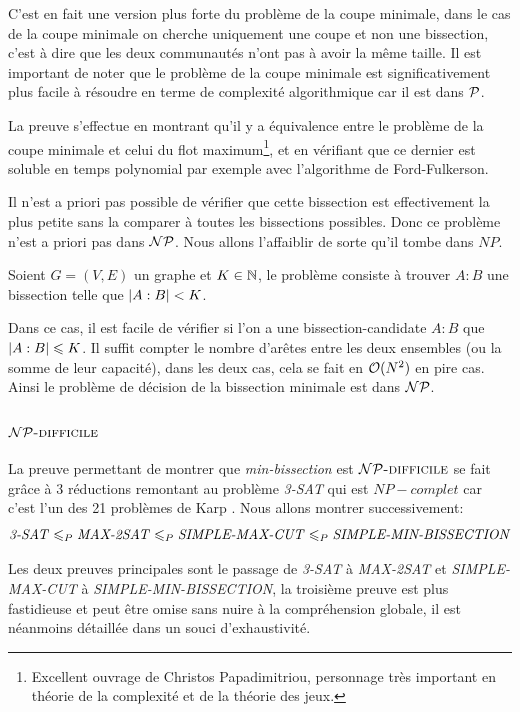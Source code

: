 \documentclass{standalone}
\begin{document}
\begin{rem}
	C'est en fait une version plus forte du problème de la coupe minimale, dans le cas de la coupe minimale on cherche uniquement une coupe et non une bissection, c'est à dire que les deux communautés n'ont pas à avoir la même taille. Il est important de noter que le problème de la coupe minimale est significativement plus facile à résoudre en terme de complexité algorithmique car il est dans $\PP$.
	
	La preuve s'effectue en montrant qu'il y a équivalence entre le problème de la coupe minimale et celui du flot maximum\cite{papadimitriou1982combinatorial}\footnote{Excellent ouvrage de Christos Papadimitriou, personnage très important en théorie de la complexité et de la théorie des jeux.}, et en vérifiant que ce dernier est soluble en temps polynomial par exemple avec l'algorithme de Ford-Fulkerson.
\end{rem}

Il n'est a priori pas possible de vérifier que cette bissection est effectivement la plus petite sans la comparer à toutes les bissections possibles. Donc ce problème n'est a priori pas dans $\NP$. Nous allons l'affaiblir de sorte qu'il tombe dans $NP$.
\begin{defn}
	Soient $G=(V, E)$ un graphe et $K \in \N$, le problème consiste à trouver $A:B$ une bissection telle que $\card{A:B} < K$.
\end{defn}
Dans ce cas, il est facile de vérifier si l'on a une bissection-candidate $A:B$ que $\card{A:B} \leq K$. Il suffit compter le nombre d'arêtes entre les deux ensembles (ou la somme de leur capacité), dans les deux cas, cela se fait en $\Orond(N^2)$ en pire cas. Ainsi le problème de décision de la bissection minimale est  dans $\NP$.

\subsubsection{$\NPHARD$}

La preuve permettant de montrer que \textit{min-bissection} est $\NPHARD$ se fait grâce à 3 réductions remontant au problème \textit{3-SAT} qui est $NP-complet$ car c'est l'un des 21 problèmes de Karp \cite{21karp}. Nous allons montrer successivement:
\[ \text{\textit{3-SAT}} \leq_P \text{\textit{MAX-2SAT}} \leq_P \text{\textit{SIMPLE-MAX-CUT}} \leq_P \text{\textit{SIMPLE-MIN-BISSECTION}} \]

Les deux preuves principales sont le passage de \textit{3-SAT} à \textit{MAX-2SAT} et \textit{SIMPLE-MAX-CUT} à \textit{SIMPLE-MIN-BISSECTION}, la troisième preuve est plus fastidieuse et peut être omise sans nuire à la compréhension globale, il est néanmoins détaillée dans un souci d'exhaustivité.
\end{document}
